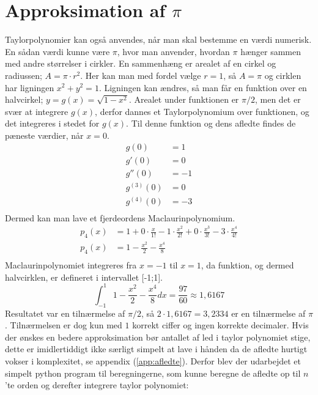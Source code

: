\section{Approksimation af $\pi$}
Taylorpolynomier kan også anvendes, når man skal bestemme en værdi numerisk. En sådan værdi kunne være $\pi$, hvor man anvender, hvordan $\pi$ hænger sammen med andre størrelser i cirkler. En sammenhæng er arealet af en cirkel og radiussen; $A=\pi \cdot r^2$. Her kan man med fordel vælge $r=1$, så $A=\pi$ og cirklen har ligningen $x^2+y^2=1$. Ligningen kan ændres, så man får en funktion over en halvcirkel; $y=g(x)=\sqrt{1-x^2}$. Arealet under funktionen er $\pi/2$, men det er svær at integrere $g(x)$, derfor dannes et Taylorpolynomium over funktionen, og det integreres i stedet for $g(x)$. Til denne funktion og dens afledte findes de pæneste værdier, når $x=0$.
\begin{align*}
g(0) &= 1 \\
g'(0) &= 0 \\
g''(0) &= -1 \\
g^{(3)}(0) &= 0 \\
g^{(4)}(0) &= -3 \\
\end{align*}
Dermed kan man lave et fjerdeordens Maclaurinpolynomium.
\begin{align*}
p_{4} (x) &= 1 + 0\cdot \frac{x}{1!} - 1\cdot \frac{x^2}{2!} + 0\cdot \frac{x^3}{3!} - 3\cdot \frac{x^4}{4!}
\\
p_{4} (x) &= 1-\frac{x^2}{2}-\frac{x^4}{8} \\
\end{align*}
Maclaurinpolynomiet integreres fra $x=-1$ til $x=1$, da funktion, og dermed halvcirklen, er defineret i intervallet [-1;1].
\[
\int_{-1}^{1} 1-\frac{x^2}{2}-\frac{x^4}{8} dx = \frac{97}{60} \approx 1,6167
\]
Resultatet var en tilnærmelse af $\pi/2$, så $2\cdot 1,6167 = 3,2334$ er en tilnærmelse af $\pi$. Tilnærmelsen er dog kun med $1$ korrekt ciffer og ingen korrekte decimaler. 
Hvis der ønskes en bedere approksimation bør antallet af led i taylor polynomiet stige, dette er 
imidlertiddigt ikke særligt simpelt at lave i hånden da de afledte hurtigt vokser i komplexitet, 
se appendix (\ref{app:afledte}).  %
Derfor blev der udarbejdet et simpelt python program til beregningerne, 
som kunne beregne de afledte op til $n$'te orden og derefter integrere taylor polynomiet:

